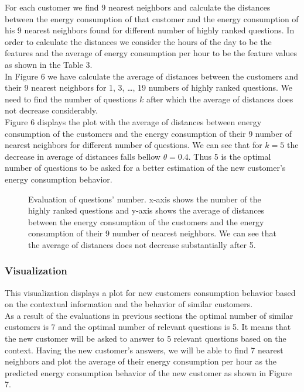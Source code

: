 \documentclass{sig-alternate-10pt}
\begin{document}
For each customer we find 9 nearest neighbors and calculate the distances between the energy consumption of that customer and the energy consumption of his 9 nearest neighbors found for different number of highly ranked questions. In order to calculate the distances we consider the hours of the day to be the features and the average of energy consumption per hour to be the feature values as shown in the Table 3.\\ 

In Figure 6 we have calculate the average of distances between the customers and their 9 nearest neighbors for 1, 3, \ldots , 19 numbers of highly ranked questions. We need to find the number of questions $k$ after which the average of distances does not decrease considerably.\\

Figure 6 displays the plot with the average of distances between energy consumption of the customers and the energy consumption of their 9 number of nearest neighbors for different number of questions. We can see that for $k=5$ the decrease in average of distances falls bellow $\theta=0.4$. Thus 5 is the optimal number of questions to be asked for a better estimation of the new customer's energy consumption behavior.\\ 

\begin{figure}
\centering
{}
\caption{Evaluation of questions' number. x-axis shows the number of the highly ranked questions and y-axis shows the average of distances between the energy consumption of the customers and the energy consumption of their 9 number of nearest neighbors. We can see that the average of distances does not decrease substantially after 5.}
\end{figure}

\subsubsection{Visualization}

This visualization displays a plot for new customers consumption behavior based on the contextual information and the behavior of similar customers.\\

As a result of the evaluations in previous sections the optimal number of similar customers is 7 and the optimal number of relevant questions is 5. It means that the new customer will be asked to answer to 5 relevant questions based on the context. Having the new customer's answers, we will be able to find 7 nearest neighbors and plot the average of their energy consumption per hour as the predicted energy consumption behavior of the new customer as shown in Figure 7.\\ 
\end{document}
